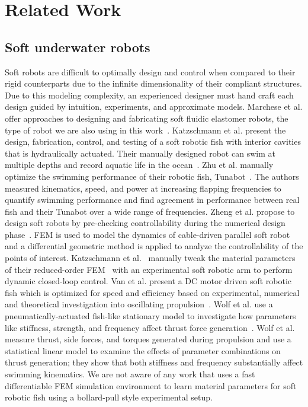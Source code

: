 \section{Related Work}
\label{related_work}

\subsection{Soft underwater robots}
Soft robots are difficult to optimally design and control when compared to their rigid counterparts due to the infinite dimensionality of their compliant structures.
Due to this modeling complexity, an experienced designer must hand craft each design guided by intuition, experiments, and approximate models.
Marchese et al. offer approaches to designing and fabricating soft fluidic elastomer robots, the type of robot we are also using in this work~\cite{marchese2015recipe}.
%
Katzschmann et al. present the design, fabrication, control, and testing of a soft robotic fish with interior cavities that is hydraulically actuated. Their manually designed robot can swim at multiple depths and record aquatic life in the ocean~\cite{katzschmann2016hydraulic,katzschmann2018exploration}. 
Zhu et al. manually optimize the swimming performance of their robotic fish, Tunabot~\cite{zhu2019tuna}. The authors measured kinematics, speed, and power at increasing flapping frequencies to quantify swimming performance and find agreement in performance between real fish and their Tunabot over a wide range of frequencies.
Zheng et al. propose to design soft robots by pre-checking controllability during the numerical design phase~\cite{zheng2019controllability}. FEM is used to model the dynamics of cable-driven parallel soft robot and a differential geometric method is applied to analyze the controllability of the points of interest.
Katzschmann et al.~\cite{katzschmann2019dynamically} manually tweak the material parameters of their reduced-order FEM~\cite{thieffry2018control} with an experimental soft robotic arm to perform dynamic closed-loop control.
Van et al. present a DC motor driven soft robotic fish which is optimized for speed and efficiency based on experimental, numerical and theoretical investigation into oscillating propulsion~\cite{van2020biomimetic}.
Wolf et al. use a pneumatically-actuated fish-like stationary model to investigate how parameters like stiffness, strength, and frequency affect thrust force generation~\cite{wolf2020fish}. Wolf et al. measure thrust, side forces, and torques generated during propulsion and use a statistical linear model to examine the effects of parameter combinations on thrust generation; they show that both stiffness and frequency substantially affect swimming kinematics.
We are not aware of any work that uses a fast differentiable FEM simulation environment to learn material parameters for soft robotic fish using a bollard-pull style experimental setup.

